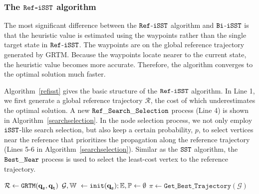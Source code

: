 \documentclass[conference, onecolumn]{IEEEtran}
\begin{document}
\subsubsection{The ${{\tt Ref}}$-$\tt iSST$ algorithm}

 
The most significant difference between the $\tt Ref$-$\tt iSST$ algorithm and $\tt Bi$-$\tt iSST$ is that the heuristic value is estimated using the waypoints rather than the single target state in $\tt Ref$-$\tt iSST$. The waypoints are on the global reference trajectory generated by GRTM. Because the waypoints locate nearer to the current state, the heuristic value becomes more accurate. Therefore, the algorithm converges to the optimal solution much faster.

Algorithm~\ref{refisst} gives the basic structure of the $\tt Ref$-$\tt iSST$ algorithm. In Line 1, we first generate a global reference trajectory $\mathcal{R}$, the cost of which underestimates the optimal solution. A new {$\tt Ref\_Search\_Selection$} process (Line 4) is shown in Algorithm~\ref{searchselection}. 
In the node selection process, we not only employ $\tt iSST$-like search selection, but also keep a certain probability, $p$, to select vertices near the reference that prioritizes the propagation along the reference trajectory (Lines 5-6 in Algorithm~\ref{searchselection}). Similar as the $\tt SST$ algorithm, the ${\tt Best\_Near}$ process is used to select the least-cost vertex to the reference trajectory.



\begin{algorithm}[ht!]
	\caption {${{\tt Ref}}$-${{\tt iSST}}$}
	\label{refisst}
	\DontPrintSemicolon
	\SetAlgoVlined
	\BlankLine
	$\mathcal{R} \gets \tt{GRTM}(\textbf{q}_{\tt s},\textbf{q}_{\tt t}) $\;
	$\mathcal{G},\mathbb{W}\  \gets \tt{init}(\textbf{q}_{\tt s});\mathbb{E}, \mathbb{P}\gets \emptyset $\;
	$\mathcal{\pi} \gets \mathtt{Get\_Best\_Trajectory}(\mathcal{G})$	
\end{algorithm}
\end{document}
